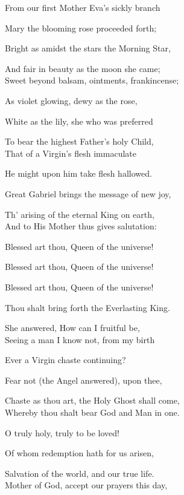 \begin{multicols}{2}
From our first Mother Eva's sickly branch

Mary the blooming rose proceeded forth;

Bright as amidst the stars the Morning Star,

And fair in beauty as the moon she came;\\

Sweet beyond balsam, ointments, frankincense;

As violet glowing, dewy as the rose,

White as the lily, she who was preferred

To bear the highest Father's holy Child,\\


That of a Virgin's flesh immaculate

He might upon him take flesh hallowed.

Great Gabriel brings the message of new joy,

Th' arising of the eternal King on earth,\\

And to His Mother thus gives salutation:

Blessed art thou, Queen of the universe!

Blessed art thou, Queen of the universe!

Blessed art thou, Queen of the universe!

Thou shalt bring forth the Everlasting King.

She answered, How can I fruitful be,\\

Seeing a man I know not, from my birth

Ever a Virgin chaste continuing?

Fear not (the Angel answered), upon thee,

Chaste as thou art, the Holy Ghost shall come,\\

Whereby thou shalt bear God and Man in one.

O truly holy, truly to be loved!

Of whom redemption hath for us arisen,

Salvation of the world, and our true life.\\

Mother of God, accept our prayers this day,


\end{multicols}

